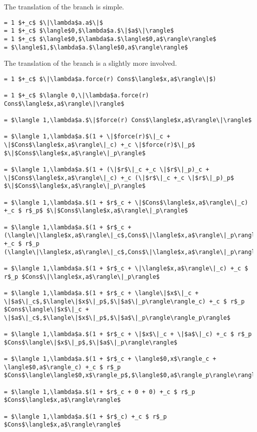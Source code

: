 The translation of the  branch is simple.
%
\begin{lstlisting}
= 1 $+_c$ $\|\lambda$a.a$\|$
= 1 $+_c$ $\langle$0,$\lambda$a.$\|$a$\|\rangle$
= 1 $+_c$ $\langle$0,$\lambda$a.$\langle$0,a$\rangle\rangle$
= $\langle$1,$\lambda$a.$\langle$0,a$\rangle\rangle$
\end{lstlisting}
%

The translation of the  branch is a slightly more involved.
%
\begin{lstlisting}
= 1 $+_c$ $\|\lambda$a.force(r) Cons$\langle$x,a$\rangle\|$)

= 1 $+_c$ $\langle 0,\|\lambda$a.force(r) Cons$\langle$x,a$\rangle\|\rangle$

= $\langle 1,\lambda$a.$\|$force(r) Cons$\langle$x,a$\rangle\|\rangle$

= $\langle 1,\lambda$a.$(1 + \|$force(r)$\|_c + \|$Cons$\langle$x,a$\rangle\|_c) +_c \|$force(r)$\|_p$ $\|$Cons$\langle$x,a$\rangle\|_p\rangle$

= $\langle 1,\lambda$a.$(1 + (\|$r$\|_c +_c \|$r$\|_p)_c + \|$Cons$\langle$x,a$\rangle\|_c) +_c (\|$r$\|_c +_c \|$r$\|_p)_p$ $\|$Cons$\langle$x,a$\rangle\|_p\rangle$

= $\langle 1,\lambda$a.$(1 + $r$_c + \|$Cons$\langle$x,a$\rangle\|_c) +_c $ r$_p$ $\|$Cons$\langle$x,a$\rangle\|_p\rangle$

= $\langle 1,\lambda$a.$(1 + $r$_c + (\langle\|\langle$x,a$\rangle\|_c$,Cons$\|\langle$x,a$\rangle\|_p\rangle)_c) +_c $ r$_p (\langle\|\langle$x,a$\rangle\|_c$,Cons$\|\langle$x,a$\rangle\|_p\rangle)_p\rangle$

= $\langle 1,\lambda$a.$(1 + $r$_c + \|\langle$x,a$\rangle\|_c) +_c $ r$_p $Cons$\|\langle$x,a$\rangle\|_p\rangle$

= $\langle 1,\lambda$a.$(1 + $r$_c + \langle\|$x$\|_c + \|$a$\|_c$,$\langle\|$x$\|_p$,$\|$a$\|_p\rangle\rangle_c) +_c $ r$_p $Cons$\langle\|$x$\|_c + \|$a$\|_c$,$\langle\|$x$\|_p$,$\|$a$\|_p\rangle\rangle_p\rangle$

= $\langle 1,\lambda$a.$(1 + $r$_c + \|$x$\|_c + \|$a$\|_c) +_c $ r$_p $Cons$\langle\|$x$\|_p$,$\|$a$\|_p\rangle\rangle$

= $\langle 1,\lambda$a.$(1 + $r$_c + \langle$0,x$\rangle_c + \langle$0,a$\rangle_c) +_c $ r$_p $Cons$\langle\langle$0,x$\rangle_p$,$\langle$0,a$\rangle_p\rangle\rangle$

= $\langle 1,\lambda$a.$(1 + $r$_c + 0 + 0) +_c $ r$_p $Cons$\langle$x,a$\rangle\rangle$

= $\langle 1,\lambda$a.$(1 + $r$_c) +_c $ r$_p $Cons$\langle$x,a$\rangle\rangle$
\end{lstlisting}
